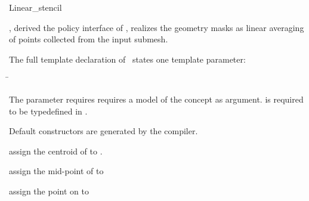 \begin{ccRefClass}{Linear_stencil}

\ccDefinition

\ccClassTemplateName , derived the policy interface of 
, realizes the geometry masks as linear 
averaging of points collected from the input submesh.


\ccParameters

The full template declaration of \ccClassTemplateName\ states one
template parameter:

\begin{tabbing}
 \=\\
\end{tabbing}
   
The  parameter requires requires a model of 
the  concept as argument. 
 is required to be typedefined in .

\ccCreation

Default constructors are generated by the compiler.


\ccThree{}{}{}

{assign the centroid of  to .}

{assign the mid-point of  to }

{assign the point on  to }

\ccSeeAlso

\\
\\
\\
\\
\\

\end{ccRefClass}

\ccRefPageEnd



